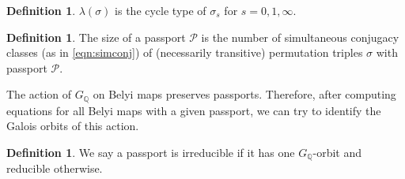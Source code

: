 \documentclass{dcthesis}
\newcommand{\QQ}{\mathbb Q}
\newcommand{\defi}[1]{\textsf{#1}}
\theoremstyle{definition}
\newtheorem{definition}[prop]{Definition}
\theoremstyle{remark}
\numberwithin{equation}{section}
\numberwithin{figure}{section}
\begin{document}
{{\begin{definition}
      $\lambda(\sigma)$ is the cycle type of $\sigma_s$ for $s=0,1,\infty$.
    \end{definition}
    \begin{definition}
      \label{def:passportsize}
      The
      \defi{size} of a passport $\mathcal{P}$ is the number of simultaneous conjugacy
      classes (as in \ref{eqn:simconj}) of (necessarily transitive) permutation
      triples $\sigma$ with passport $\mathcal{P}$.
    \end{definition}
    The action of $G_\QQ$ on Belyi maps preserves passports.
    Therefore, after computing equations for all Belyi maps with a given
    passport, we can try to identify the Galois orbits of this action.
    \begin{definition}
      \label{def:reduciblepassport}
      We say a passport is \defi{irreducible} if it has one
      $G_\QQ$-orbit and
      \defi{reducible} otherwise.
    \end{definition}
  }
}
\end{document}
